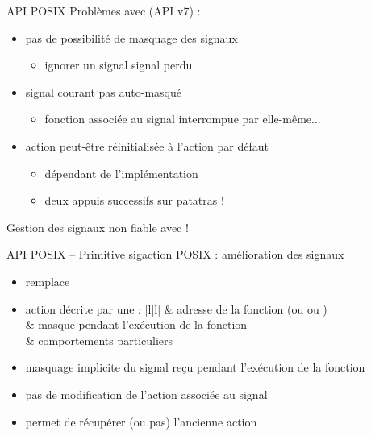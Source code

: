 \begin {frame} {API POSIX}
    Problèmes avec  (API v7) :

    \begin {itemize}
	\item pas de possibilité de masquage des signaux
	    \begin {itemize}
		\item ignorer un signal \implique signal perdu
	    \end {itemize}
	\item signal courant pas auto-masqué
	    \begin {itemize}
		\item fonction associée au signal interrompue par
		    elle-même...
	    \end {itemize}
	\item action peut-être réinitialisée à l'action par défaut
	    \begin {itemize}
		\item dépendant de l'implémentation
		\item deux appuis successifs sur
		     \implique patatras !
	    \end {itemize}
    \end {itemize}

    \vspace* {3mm}

    Gestion des signaux non fiable avec  !
\end {frame}

\begin {frame} {API POSIX -- Primitive sigaction}
    POSIX : amélioration des signaux


    \begin {itemize}
	\item {} remplace 
	\item action décrite par une  :
	    \ctableau {\fC} {|l|l|} {
		\rc {}
		    & adresse de la fonction (ou  ou
			)
		    \\
		\rc {}
		    & masque pendant l'exécution de la fonction
		    \\
		\rc {}
		    & comportements particuliers
		    \\
	    }

	    \vspace* {1mm}

	\item masquage implicite du signal reçu pendant l'exécution
	    de la fonction
	\item pas de modification de l'action associée au signal
	\item permet de récupérer (ou pas) l'ancienne action
    \end {itemize}
\end {frame}

